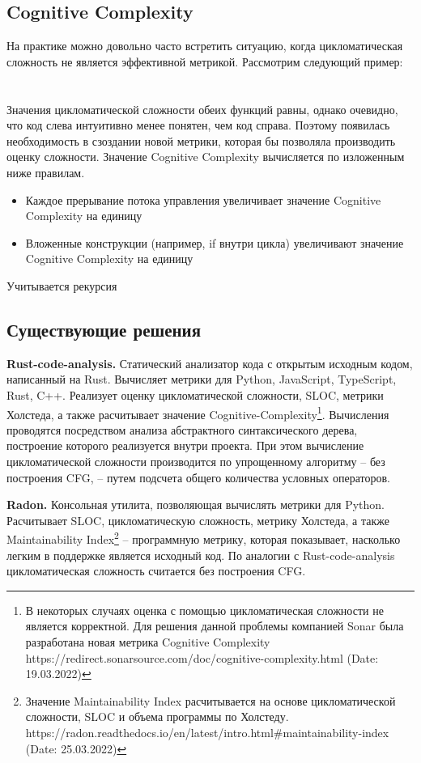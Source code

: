 \subsection{Cognitive Complexity}
На практике можно довольно часто встретить ситуацию, когда цикломатическая сложность
не является эффективной метрикой. Рассмотрим следующий пример:
\\
\\
\\
Значения цикломатической сложности обеих функций равны, однако очевидно, что код слева интуитивно менее понятен, чем код справа. Поэтому появилась необходимость в сзоздании новой метрики, которая бы позволяла производить оценку сложности.
Значение Cognitive Complexity вычисляется по изложенным ниже правилам.
\begin{itemize}
    \item Каждое прерывание потока управления увеличивает значение Cognitive Complexity на единицу
    \item Вложенные конструкции (например, if внутри цикла) увеличивают значение Cognitive Complexity на единицу 
\end{itemize}
Учитывается рекурсия
\newpage
\subsection{Существующие решения}
\textbf{Rust-code-analysis.} Статический анализатор кода с открытым исходным кодом, написанный на Rust. Вычисляет метрики для Python, JavaScript, TypeScript, Rust, C++. Реализует оценку 
цикломатической сложности, SLOC, метрики Холстеда, а также расчитывает значение Cognitive-Complexity\footnote{В некоторых случаях оценка с помощью цикломатическая сложности не является корректной. Для решения данной проблемы компанией Sonar была разработана новая метрика Cognitive Complexity 
\\https://redirect.sonarsource.com/doc/cognitive-complexity.html (Date: 19.03.2022)}. Вычисления проводятся посредством анализа абстрактного синтаксического дерева, построение которого
реализуется внутри проекта. При этом вычисление цикломатической сложности
производится по упрощенному алгоритму -- без построения CFG, -- путем подсчета
общего количества условных операторов.

\textbf{Radon.} Консольная утилита, позволяющая вычислять метрики для Python. Расчитывает SLOC, цикломатическую сложность, метрику Холстеда, а также Maintainability Index\footnote{Значение Maintainability Index расчитывается на основе цикломатической сложности, SLOC и объема программы по Холстеду. https://radon.readthedocs.io/en/latest/intro.html\#maintainability-index (Date: 25.03.2022)} -- программную метрику, которая показывает, насколько 
легким в поддержке является исходный код. По аналогии с Rust-code-analysis 
цикломатическая сложность считается без построения CFG.

